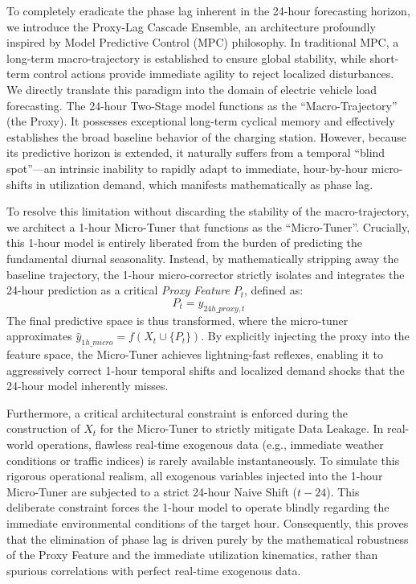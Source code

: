 \documentclass[pdflatex,sn-mathphys-num]{sn-jnl}%
\theoremstyle{thmstyleone}%
\theoremstyle{thmstyletwo}%
\theoremstyle{thmstylethree}%
\begin{document}
To completely eradicate the phase lag inherent in the 24-hour forecasting horizon, we introduce the Proxy-Lag Cascade Ensemble, an architecture profoundly inspired by Model Predictive Control (MPC) philosophy. In traditional MPC, a long-term macro-trajectory is established to ensure global stability, while short-term control actions provide immediate agility to reject localized disturbances. We directly translate this paradigm into the domain of electric vehicle load forecasting. The 24-hour Two-Stage model functions as the ``Macro-Trajectory'' (the Proxy). It possesses exceptional long-term cyclical memory and effectively establishes the broad baseline behavior of the charging station. However, because its predictive horizon is extended, it naturally suffers from a temporal ``blind spot''---an intrinsic inability to rapidly adapt to immediate, hour-by-hour micro-shifts in utilization demand, which manifests mathematically as phase lag.

To resolve this limitation without discarding the stability of the macro-trajectory, we architect a 1-hour Micro-Tuner that functions as the ``Micro-Tuner''. Crucially, this 1-hour model is entirely liberated from the burden of predicting the fundamental diurnal seasonality. Instead, by mathematically stripping away the baseline trajectory, the 1-hour micro-corrector strictly isolates and integrates the 24-hour prediction as a critical \textit{Proxy Feature} $P_t$, defined as:
\begin{equation}
P_t = \hat{y}_{24h\_proxy, t}
\end{equation}
The final predictive space is thus transformed, where the micro-tuner approximates $\hat{y}_{1h\_micro} = f(X_t \cup \{P_t\})$. By explicitly injecting the proxy into the feature space, the Micro-Tuner achieves lightning-fast reflexes, enabling it to aggressively correct 1-hour temporal shifts and localized demand shocks that the 24-hour model inherently misses.

Furthermore, a critical architectural constraint is enforced during the construction of $X_t$ for the Micro-Tuner to strictly mitigate Data Leakage. In real-world operations, flawless real-time exogenous data (e.g., immediate weather conditions or traffic indices) is rarely available instantaneously. To simulate this rigorous operational realism, all exogenous variables injected into the 1-hour Micro-Tuner are subjected to a strict 24-hour Naive Shift ($t-24$). This deliberate constraint forces the 1-hour model to operate blindly regarding the immediate environmental conditions of the target hour. Consequently, this proves that the elimination of phase lag is driven purely by the mathematical robustness of the Proxy Feature and the immediate utilization kinematics, rather than spurious correlations with perfect real-time exogenous data.
\end{document}

